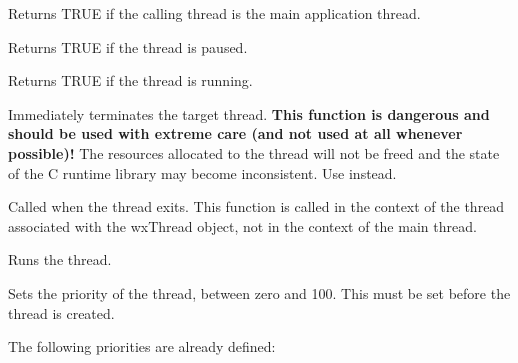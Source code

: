 \label{wxthreadismain}


Returns TRUE if the calling thread is the main application thread.

\label{wxthreadispaused}


Returns TRUE if the thread is paused.

\label{wxthreadisrunning}


Returns TRUE if the thread is running.

\label{wxthreadkill}


Immediately terminates the target thread. {\bf This function is dangerous and should
be used with extreme care (and not used at all whenever possible)!} The resources
allocated to the thread will not be freed and the state of the C runtime library
may become inconsistent. Use  instead.

\label{wxthreadonexit}


Called when the thread exits. This function is called in the context of the thread
associated with the wxThread object, not in the context of the main thread.

\label{wxthreadrun}


Runs the thread.

\label{wxthreadsetpriority}


Sets the priority of the thread, between zero and 100. This must be set before the thread is created.

The following priorities are already defined:

\twocolwidtha{7cm}
\begin{twocollist}\itemsep=0pt
\end{twocollist}

